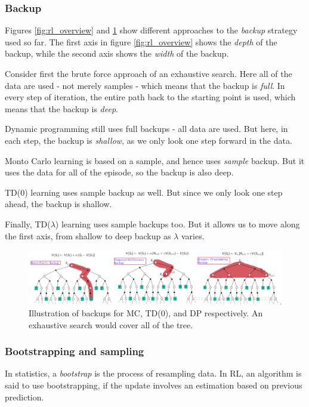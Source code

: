 \documentclass[12pt, a4paper]{article}
\numberwithin{equation}{section}
\begin{document}
\subsubsection{Backup}
Figures \ref{fig:rl_overview} and \ref{fig:backups} show different approaches to the \textit{backup} strategy used so far. The first axis in figure \ref{fig:rl_overview} shows the \textit{depth} of the backup, while the second axis shows the \textit{width} of the backup.

Consider first the brute force approach of an exhaustive search. Here all of the data are used - not merely samples - which means that the backup is \textit{full}. In every step of iteration, the entire path back to the starting point is used, which means that the backup is \textit{deep}.

Dynamic programming still uses full backups - all data are used. But here, in each step, the backup is \textit{shallow}, as we only look one step forward in the data.

Monto Carlo learning is based on a sample, and hence uses \textit{sample} backup. But it uses the data for all of the episode, so the backup is also deep.

TD(0) learning uses sample backup as well. But since we only look one step ahead, the backup is shallow.

Finally, TD($\lambda$) learning uses sample backups too. But it allows us to move along the first axis, from shallow to deep backup as $\lambda$ varies.

\begin{figure}
\centering
\includegraphics[width=\textwidth]{backups}
\caption{Illustration of backups for MC, TD(0), and DP respectively. An exhaustive search would cover all of the tree.}
\label{fig:backups}
\end{figure}

\subsubsection{Bootstrapping and sampling}
In statistics, a \textit{bootstrap} is the process of resampling data. In RL, an algorithm is said to use bootstrapping, if the update involves an estimation based on previous prediction.
\end{document}
